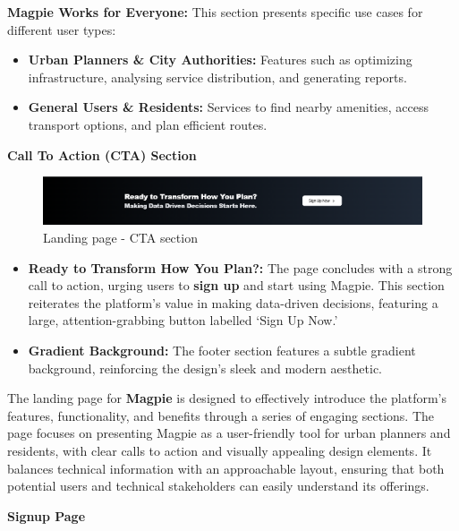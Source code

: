\textbf{Magpie Works for Everyone:} This section presents specific use cases for
different user types:
\begin{itemize}
    \item{}  \textbf{Urban Planners \& City Authorities:} Features such as
    optimizing infrastructure, analysing service distribution, and generating
    reports.
    \item{} \textbf{General Users \& Residents:} Services to find nearby
    amenities, access transport options, and plan efficient routes.
\end{itemize}

\newpage{}

\textbf{Call To Action (CTA) Section}

\begin{figure}[htbp]
    \centering{}
    \includegraphics[width=1\textwidth]{images/site/landing/landing_5_cta.png}
    \caption{Landing page {-} CTA section}
\end{figure}

\begin{itemize}
    \item{} \textbf{Ready to Transform How You Plan?:} The page concludes with a
    strong call to action, urging users to \textbf{sign up} and start using
    Magpie. This section reiterates the platform's value in making data{-}driven
    decisions, featuring a large, attention{-}grabbing button labelled `Sign Up
    Now.'
    \item{} \textbf{Gradient Background:} The footer section features a subtle
    gradient background, reinforcing the design's sleek and modern aesthetic.
\end{itemize}

The landing page for \textbf{Magpie} is designed to effectively introduce the
platform's features, functionality, and benefits through a series of engaging
sections. The page focuses on presenting Magpie as a user{-}friendly tool for
urban planners and residents, with clear calls to action and visually appealing
design elements. It balances technical information with an approachable layout,
ensuring that both potential users and technical stakeholders can easily
understand its offerings.

\textbf{Signup Page}

